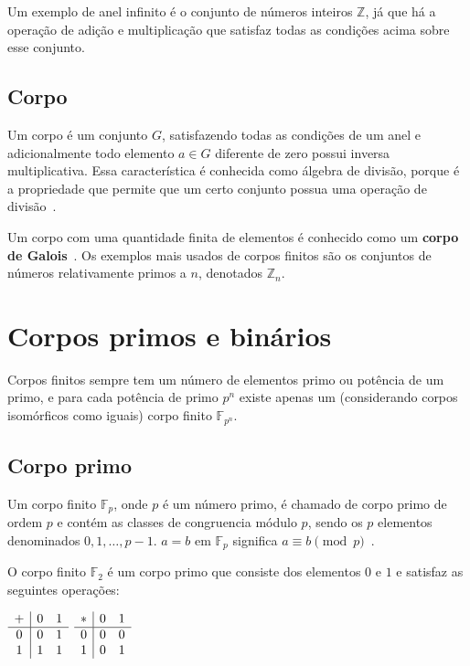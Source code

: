 \documentclass[12pt]{article}
\begin{document}
Um exemplo de anel infinito é o conjunto de números inteiros $\mathbb{Z}$, já
que há a operação de adição e multiplicação que satisfaz todas as condições
acima sobre esse conjunto.

\subsection{Corpo}

Um corpo é um conjunto $G$, satisfazendo todas as condições de um anel e
adicionalmente todo elemento $a \in G$ diferente de zero possui inversa
multiplicativa. Essa característica é conhecida como álgebra de divisão, porque
é a propriedade que permite que um certo conjunto possua uma operação de
divisão~\cite{weisstein:1999:fieldaxioms}.

Um corpo com uma quantidade finita de elementos é conhecido como um
\textbf{corpo de Galois}~\cite{weisstein:1999:finitefield}. Os exemplos mais usados de corpos finitos são os
conjuntos de números relativamente primos a $n$, denotados $\mathbb{Z}_{n}$.

\section{Corpos primos e binários}

Corpos finitos sempre tem um número de elementos primo ou potência de um primo,
e para cada potência de primo $p^{n}$ existe apenas um (considerando corpos
isomórficos como iguais) corpo finito $\mathbb{F}_{p^{n}}$.

\subsection{Corpo primo}

Um corpo finito $\mathbb{F}_{p}$, onde $p$ é um número primo, é chamado de
corpo primo de ordem $p$ e contém as classes de congruencia módulo $p$, sendo
os $p$ elementos denominados $0, 1, \ldots, p-1$. $a = b$ em $\mathbb{F}_{p}$
significa $a \equiv b \pmod{p}$~\cite{weisstein:1999:2}.

O corpo finito $\mathbb{F}_{2}$ é um corpo primo que consiste dos elementos $0$
e $1$ e satisfaz as seguintes operações:

\begin{center}
    $\begin{array}{ c | c c }
        + & 0 & 1 \\ \hline
        0 & 0 & 1 \\
        1 & 1 & 1
    \end{array}$
    \hspace{4em}
    $\begin{array}{ c | c c }
        * & 0 & 1 \\ \hline
        0 & 0 & 0 \\
        1 & 0 & 1
    \end{array}$
\end{center}
\end{document}
